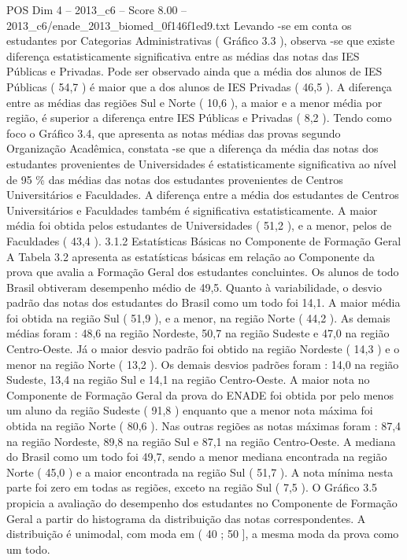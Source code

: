 \begin{textsample}{POS Dim 4 – 2013\_c6 – Score 8.00 – 2013\_c6/enade\_2013\_biomed\_0f146f1ed9.txt}
Levando -se em conta os estudantes por Categorias Administrativas ( Gráfico 3.3 ), observa -se que existe diferença estatisticamente significativa entre as médias das notas das IES Públicas e Privadas.
Pode ser observado ainda que a média dos alunos de IES Públicas ( 54,7 ) é maior que a dos alunos de IES Privadas ( 46,5 ).
A diferença entre as médias das regiões Sul e Norte ( 10,6 ), a maior e a menor média por região, é superior a diferença entre IES Públicas e Privadas ( 8,2 ).
Tendo como foco o Gráfico 3.4, que apresenta as notas médias das provas segundo Organização Acadêmica, constata -se que a diferença da média das notas dos estudantes provenientes de Universidades é estatisticamente significativa ao nível de 95 \% das médias das notas dos estudantes provenientes de Centros Universitários e Faculdades.
A diferença entre a média dos estudantes de Centros Universitários e Faculdades também é significativa estatisticamente.
A maior média foi obtida pelos estudantes de Universidades ( 51,2 ), e a menor, pelos de Faculdades ( 43,4 ). 3.1.2 Estatísticas Básicas no Componente de Formação Geral A Tabela 3.2 apresenta as estatísticas básicas em relação ao Componente da prova que avalia a Formação Geral dos estudantes concluintes.
Os alunos de todo Brasil obtiveram desempenho médio de 49,5.
Quanto à variabilidade, o desvio padrão das notas dos estudantes do Brasil como um todo foi 14,1.
A maior média foi obtida na região Sul ( 51,9 ), e a menor, na região Norte ( 44,2 ).
As demais médias foram : 48,6 na região Nordeste, 50,7 na região Sudeste e 47,0 na região Centro-Oeste.
Já o maior desvio padrão foi obtido na região Nordeste ( 14,3 ) e o menor na região Norte ( 13,2 ).
Os demais desvios padrões foram : 14,0 na região Sudeste, 13,4 na região Sul e 14,1 na região Centro-Oeste.
A maior nota no Componente de Formação Geral da prova do ENADE foi obtida por pelo menos um aluno da região Sudeste ( 91,8 ) enquanto que a menor nota máxima foi obtida na região Norte ( 80,6 ).
Nas outras regiões as notas máximas foram : 87,4 na região Nordeste, 89,8 na região Sul e 87,1 na região Centro-Oeste.
A mediana do Brasil como um todo foi 49,7, sendo a menor mediana encontrada na região Norte ( 45,0 ) e a maior encontrada na região Sul ( 51,7 ).
A nota mínima nesta parte foi zero em todas as regiões, exceto na região Sul ( 7,5 ).
O Gráfico 3.5 propicia a avaliação do desempenho dos estudantes no Componente de Formação Geral a partir do histograma da distribuição das notas correspondentes.
A distribuição é unimodal, com moda em ( 40 ; 50 ], a mesma moda da prova como um todo.

\end{textsample}
